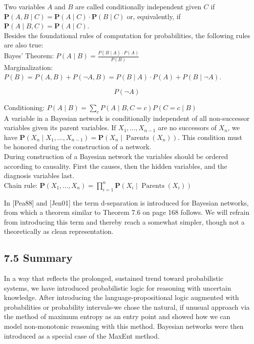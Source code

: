 \documentclass[10pt]{book}
\begin{document}
\begin{center}
\begin{enumerate}
Two variables $A$ and $B$ are called conditionally independent given $C$ if $\boldsymbol{P}(A, B \mid C)=\boldsymbol{P}(A \mid C) \cdot \boldsymbol{P}(B \mid C)$ or, equivalently, if $\boldsymbol{P}(A \mid B, C)=\boldsymbol{P}(A \mid C)$.\\
Besides the foundational rules of computation for probabilities, the following rules are also true:\\
Bayes' Theorem: $P(A \mid B)=\frac{P(B \mid A) \cdot P(A)}{P(B)}$\\
Marginalization: $P(B)=P(A, B)+P(\neg A, B)=P(B \mid A) \cdot P(A)+P(B \mid \neg A)$.

$$
P(\neg A)
$$

Conditioning: $P(A \mid B)=\sum_{c} P(A \mid B, C=c) P(C=c \mid B)$\\
A variable in a Bayesian network is conditionally independent of all non-successor variables given its parent variables. If $X_{1}, \ldots, X_{n-1}$ are no successors of $X_{n}$, we have $\boldsymbol{P}\left(X_{n} \mid X_{1}, \ldots, X_{n-1}\right)=\boldsymbol{P}\left(X_{n} \mid \operatorname{Parents}\left(X_{n}\right)\right)$. This condition must be honored during the construction of a network.\\
During construction of a Bayesian network the variables should be ordered according to causality. First the causes, then the hidden variables, and the diagnosis variables last.\\
Chain rule: $\boldsymbol{P}\left(X_{1}, \ldots, X_{n}\right)=\prod_{i=1}^{n} \boldsymbol{P}\left(X_{i} \mid \operatorname{Parents}\left(X_{i}\right)\right)$

In [Pea88] and [Jen01] the term d-separation is introduced for Bayesian networks, from which a theorem similar to Theorem 7.6 on page 168 follows. We will refrain from introducing this term and thereby reach a somewhat simpler, though not a theoretically as clean representation.

\subsection*{7.5 Summary}
In a way that reflects the prolonged, sustained trend toward probabilistic systems, we have introduced probabilistic logic for reasoning with uncertain knowledge. After introducing the language-propositional logic augmented with probabilities or probability intervals-we chose the natural, if unusual approach via the method of maximum entropy as an entry point and showed how we can model non-monotonic reasoning with this method. Bayesian networks were then introduced as a special case of the MaxEnt method.


\end{enumerate}
\end{center}
\end{document}
